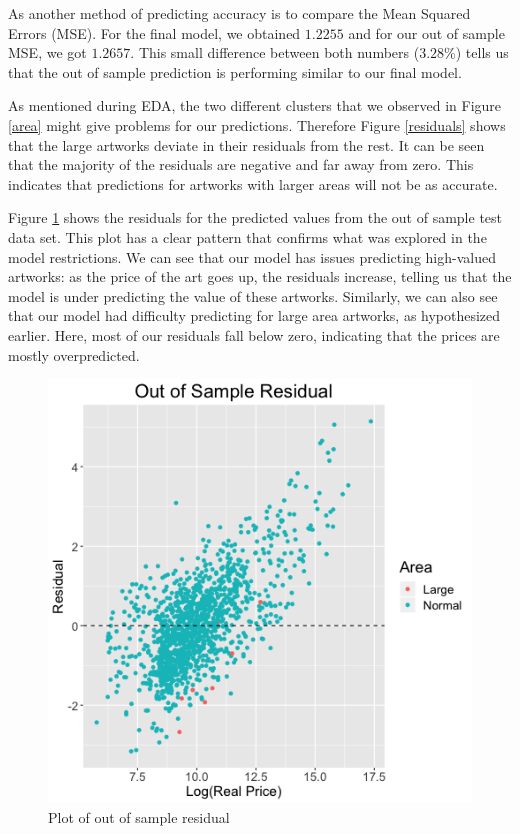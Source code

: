 \documentclass[]{asaproc}\usepackage[]{graphicx}\usepackage[]{color}
\begin{document}
As another method of predicting accuracy is to compare the Mean Squared Errors (MSE). For the final model, we obtained $1.2255$ and for our out of sample MSE, we got $1.2657$. This small difference between both numbers ($3.28$\%) tells us that the out of sample prediction is performing similar to our final model.

As mentioned during EDA, the two different clusters that we observed in Figure \ref{area} might give problems for our predictions. Therefore Figure \ref{residuals} shows that the large artworks deviate in their residuals from the rest. It can be seen that the majority of the residuals are negative and far away from zero. This indicates that predictions for artworks with larger areas will not be as accurate. 

Figure \ref{pred} shows the residuals for the predicted values from the out of sample test data set. This plot has a clear pattern that confirms what was explored in the model restrictions. We can see that our model has issues predicting high-valued artworks: as the price of the art goes up, the residuals increase, telling us that the model is under predicting the value of these artworks. Similarly, we can also see that our model had difficulty predicting  for large area artworks, as hypothesized earlier. Here, most of our residuals fall below zero, indicating that the prices are mostly overpredicted.

\begin{figure}[!ht]

\includegraphics[scale = 0.5]{predict}
\caption{Plot of out of sample residual }
\label{pred}
\end{figure}
\end{document}
